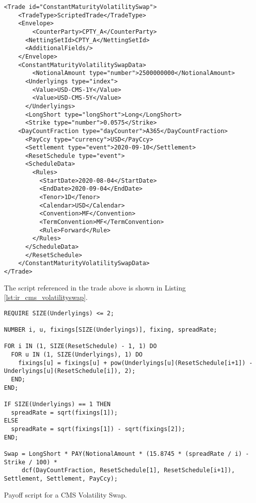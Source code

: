 \begin{verbatim}
<Trade id="ConstantMaturityVolatilitySwap">
    <TradeType>ScriptedTrade</TradeType>
    <Envelope>
        <CounterParty>CPTY_A</CounterParty>
      <NettingSetId>CPTY_A</NettingSetId>
      <AdditionalFields/>
    </Envelope>
    <ConstantMaturityVolatilitySwapData>
        <NotionalAmount type="number">2500000000</NotionalAmount>
      <Underlyings type="index">
        <Value>USD-CMS-1Y</Value>
        <Value>USD-CMS-5Y</Value>
      </Underlyings>
      <LongShort type="longShort">Long</LongShort>
      <Strike type="number">0.0575</Strike>
    <DayCountFraction type="dayCounter">A365</DayCountFraction>
      <PayCcy type="currency">USD</PayCcy>
      <Settlement type="event">2020-09-10</Settlement>
      <ResetSchedule type="event">
      <ScheduleData>
        <Rules>
          <StartDate>2020-08-04</StartDate>
          <EndDate>2020-09-04</EndDate>
          <Tenor>1D</Tenor>
          <Calendar>USD</Calendar>
          <Convention>MF</Convention>
          <TermConvention>MF</TermConvention>
          <Rule>Forward</Rule>
        </Rules>
      </ScheduleData>
      </ResetSchedule>  
    </ConstantMaturityVolatilitySwapData>
</Trade>

\end{verbatim}

The script referenced in the trade above is shown in Listing \ref{lst:ir_cms_volatilityswap}.

\begin{listing}[hbt]
\begin{verbatim}
REQUIRE SIZE(Underlyings) <= 2;

NUMBER i, u, fixings[SIZE(Underlyings)], fixing, spreadRate;

FOR i IN (1, SIZE(ResetSchedule) - 1, 1) DO
  FOR u IN (1, SIZE(Underlyings), 1) DO
    fixings[u] = fixings[u] + pow(Underlyings[u](ResetSchedule[i+1]) - Underlyings[u](ResetSchedule[i]), 2);
  END;
END;

IF SIZE(Underlyings) == 1 THEN
  spreadRate = sqrt(fixings[1]);
ELSE
  spreadRate = sqrt(fixings[1]) - sqrt(fixings[2]);
END;

Swap = LongShort * PAY(NotionalAmount * (15.8745 * (spreadRate / i) - Strike / 100) * 
     dcf(DayCountFraction, ResetSchedule[1], ResetSchedule[i+1]), Settlement, Settlement, PayCcy);
\end{verbatim}
\caption{Payoff script for a CMS Volatility Swap.}
\label{lst:ir_cms_volatilityswap}
\end{listing}

